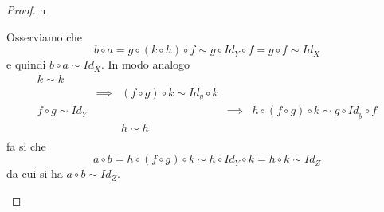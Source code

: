 \begin{proof}{n}
\begin{itemize}
\begin{equation*}
	\end{equation*}
	Osserviamo che
	\begin{equation*}
		b\circ a = g\circ \left(k\circ h\right)\circ f \sim g\circ Id_Y\circ f = g\circ f \sim Id_X
	\end{equation*}
e quindi $b\circ a\sim Id_X$. In modo analogo
\begin{equation*}
	\begin{array}{cccccc}
		k\sim k & & & &\\
		& \implies & \left(f\circ g\right)\circ k\sim Id_y\circ k& &\\
		f\circ g\sim Id_Y& & &\implies &h\circ \left(f\circ g\right)\circ k\sim g\circ Id_y\circ f \\
		& & h\sim h & &\\
	\end{array}
\end{equation*}
fa si che
\begin{equation*}
	a\circ b = h\circ \left(f\circ g\right)\circ k \sim h\circ Id_Y\circ k =h\circ k \sim Id_Z
\end{equation*}
da cui si ha $a\circ b\sim Id_Z$.\qedhere
\end{itemize}
\end{proof}
